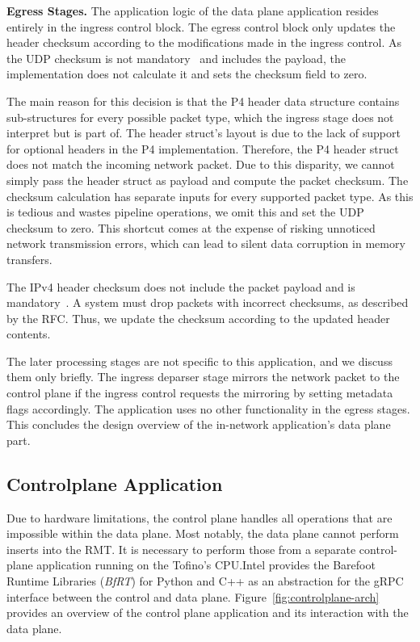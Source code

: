 \textbf{Egress Stages.}
The application logic of the data plane application resides entirely in the ingress control block. The egress control block only updates the header checksum according to the modifications made in the ingress control. As the \ac{UDP} checksum is not mandatory~\cite{ietfUserDatagramProtocol1980} and includes the payload, the implementation does not calculate it and sets the checksum field to zero.


The main reason for this decision is that the P4 header data structure contains sub-structures for every possible packet type, which the ingress stage does not interpret but is part of. The header struct's layout is due to the lack of support for optional headers in the \tofino{} P4 implementation. Therefore, the P4 header struct does not match the incoming network packet.
Due to this disparity, we cannot simply pass the header struct as payload and compute the packet checksum. The checksum calculation has separate inputs for every supported packet type. As this is tedious and wastes pipeline operations, we omit this and set the \ac{UDP} checksum to zero. This shortcut comes at the expense of risking unnoticed network transmission errors, which can lead to silent data corruption in memory transfers.

The \ac{IPv4} header checksum does not include the packet payload and is mandatory~\cite{ietfInternetProtocol1981}\@. A system must drop packets with incorrect checksums, as described by the RFC\@. Thus, we update the checksum according to the updated header contents.

The later processing stages are not specific to this application, and we discuss them only briefly. The ingress deparser stage mirrors the network packet to the control plane if the ingress control requests the mirroring by setting metadata flags accordingly. The application uses no other functionality in the egress stages. This concludes the design overview of the in-network application's data plane part.

\subsection{Controlplane Application}
Due to hardware limitations, the control plane handles all operations that are impossible within the data plane. Most notably, the data plane cannot perform inserts into the \ac{RMT}. It is necessary to perform those from a separate control-plane application running on the Tofino's CPU.\@ Intel provides the Barefoot Runtime Libraries (\emph{BfRT}) for Python and C++ as an abstraction for the \ac{gRPC} interface between the control and data plane. Figure~\ref{fig:controlplane-arch} provides an overview of the control plane application and its interaction with the data plane.

